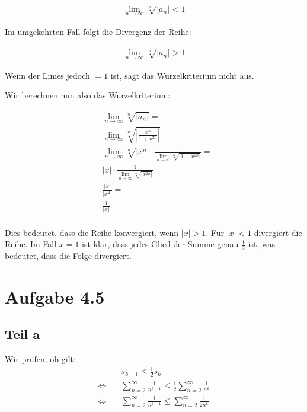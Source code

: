 \documentclass[a4paper,german,12pt,smallheadings]{scrartcl}
\begin{document}
\begin{align*}
  \lim_{n \to \infty} \sqrt[n]{\left| a_n \right|} < 1
\end{align*}

Im umgekehrten Fall folgt die Divergenz der Reihe:

\begin{align*}
  \lim_{n \to \infty} \sqrt[n]{\left| a_n \right|} > 1
\end{align*}

Wenn der Limes jedoch $=1$ ist, sagt das Wurzelkriterium nicht aus.

Wir berechnen nun also das Wurzelkriterium:

\begin{align*}
  &\lim_{n \to \infty} \sqrt[n]{\left| a_n \right|} = \\
  &\lim_{n \to \infty} \sqrt[n]{\left| \frac{x^n}{1+x^{2n}} \right|} = \\
  &\lim_{n \to \infty} \sqrt[n]{\left| x^n \right|} \cdot \frac{1}{\lim_{n \to \infty} \sqrt[n]{\left| 1+x^{2n} \right|}} = \\
  &|x| \cdot \frac{1}{\lim_{n \to \infty} \sqrt[n]{\left| x^{2n} \right|}} = \\
  &\frac{|x|}{\left| x^2 \right|} =\\
  &\frac{1}{\left| x \right|}\\
\end{align*}

Dies bedeutet, dass die Reihe konvergiert, wenn $|x| > 1$. Für $|x| < 1$
divergiert die Reihe. Im Fall $x = 1$ ist klar, dass jedes Glied der Summe
genau $\frac{1}{2}$ ist, was bedeutet, dass die Folge divergiert.

\section*{Aufgabe 4.5}
\subsection*{Teil a}

Wir prüfen, ob gilt:
\begin{align*}
  &s_{k+1} \le \frac{1}{2}s_k \\
  \Leftrightarrow\quad&\sum_{n=2}^{\infty} \frac{1}{n^{k+1}} \le \frac{1}{2} \sum_{n=2}^{\infty} \frac{1}{n^k} \\
  \Leftrightarrow\quad&\sum_{n=2}^{\infty} \frac{1}{n^{k+1}} \le \sum_{n=2}^{\infty} \frac{1}{2n^k}
\end{align*}
\end{document}
